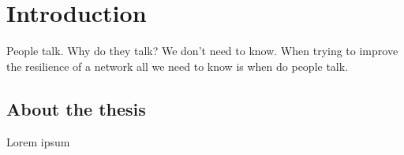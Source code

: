 \chapter{Introduction}
\label{ch:introduction}

People talk. Why do they talk? We don't need to know. When trying to improve the resilience of a network all we need to know is when do people talk.

\section{About the thesis}

Lorem ipsum